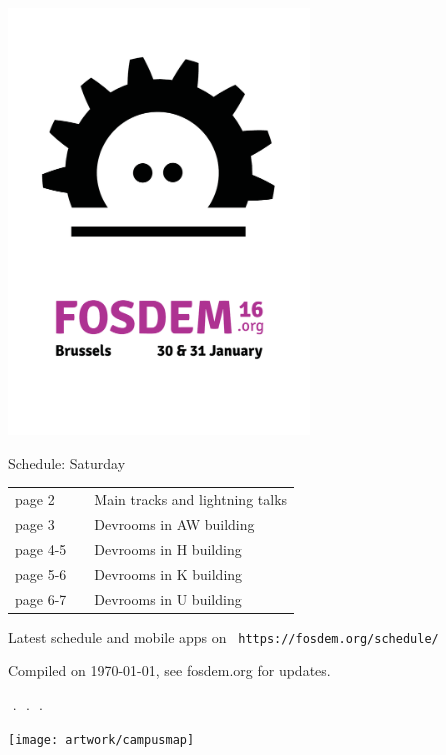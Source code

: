 \documentclass[a4paper,10pt]{article}
\begin{document}
\label{cover}
\begin{center}
\includegraphics[width=0.6\textwidth]{artwork/flyer_nobg}


{\fontsize{35}{45}\selectfont
\bf

Schedule: Saturday
}

\vfill

{\Large
\begin{tabular}{lll}
page 2   & &  Main tracks and lightning talks \\
page 3   & &  Devrooms in AW building \\
page 4-5 & &  Devrooms in H building \\
page 5-6 & &  Devrooms in K building \\
page 6-7 & &  Devrooms in U building \\
\end{tabular}

\vfill

Latest schedule and mobile apps on ~\texttt{https://fosdem.org/schedule/}
}

\vfill

\end{center}

Compiled on {\ddmmyyyydate\today}, see fosdem.org for updates.


{%
\fontsize{10.5}{7.80}\selectfont%
\renewcommand{\arraystretch}{0.88}%
%
%
}



\pagestyle{empty}
\pagebreak
$ $ .
\pagebreak
$ $ .
\pagebreak
$ $ .
\pagebreak


\label{backcover}%
\texttt{[image: artwork/campusmap]}
\end{document}
